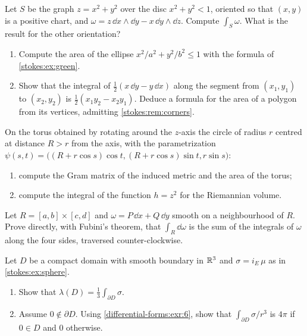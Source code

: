 \begin{notechapter}
\begin{exercise}\label{stokes:exr:2}
Let $S$ be the graph $z = x^2 + y^2$ over the disc $x^2 + y^2 < 1$,
oriented so that $(x, y)$ is a positive chart, and
$\omega = z\,\dd x\wedge\dd y - x\,\dd y\wedge\dd z$. Compute
$\int_S\omega$. What is the result for the other orientation?
\end{exercise}

\begin{exercise}\label{stokes:exr:3}
\begin{enumerate}[nosep]
  \item Compute the area of the ellipse $x^2/a^2 + y^2/b^2\leq1$ with
        the formula of \cref{stokes:ex:green}.
  \item Show that the integral of $\frac12(x\,\dd y - y\,\dd x)$ along
        the segment from $(x_1, y_1)$ to $(x_2, y_2)$ is
        $\frac12(x_1y_2 - x_2y_1)$. Deduce a formula for the area of a
        polygon from its vertices, admitting
        \cref{stokes:rem:corners}.
\end{enumerate}
\end{exercise}

\begin{exercise}\label{stokes:exr:4}
On the torus obtained by rotating around the $z$-axis the circle of
radius $r$ centred at distance $R > r$ from the axis, with the
parametrization
$\psi(s, t) = \bigl((R + r\cos s)\cos t, (R + r\cos s)\sin t,
r\sin s\bigr)$:
\begin{enumerate}[nosep]
  \item compute the Gram matrix of the induced metric and the area of
        the torus;
  \item compute the integral of the function $h = z^2$ for the
        Riemannian volume.
\end{enumerate}
\end{exercise}

\begin{exercise}\label{stokes:exr:5}
Let $R = [a, b]\times[c, d]$ and $\omega = P\,\dd x + Q\,\dd y$ smooth
on a neighbourhood of $R$. Prove directly, with Fubini's theorem, that
$\int_R\dd\omega$ is the sum of the integrals of $\omega$ along the
four sides, traversed counter-clockwise.
\end{exercise}

\begin{exercise}\label{stokes:exr:6}
Let $D$ be a compact domain with smooth boundary in $\mathbb{R}^3$ and
$\sigma = i_E\,\mu$ as in \cref{stokes:ex:sphere}.
\begin{enumerate}[nosep]
  \item Show that $\lambda(D) = \frac13\int_{\partial D}\sigma$.
  \item Assume $0\notin\partial D$. Using
        \cref{differential-forms:exr:6}, show that
        $\int_{\partial D}\sigma/r^3$ is $4\pi$ if $0\in D$ and $0$
        otherwise.
\end{enumerate}
\end{exercise}


\end{notechapter}
